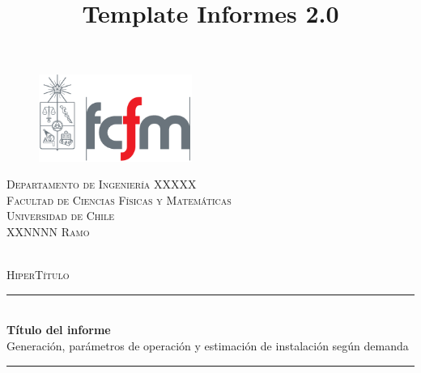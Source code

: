 \documentclass[12pt, letterpaper]{article}
\title{Template Informes 2.0} %
\newcommand{\titulo}{Título del informe}
\newcommand{\ramo}{XXNNNN Ramo}
\newcommand{\departamento}{Departamento de Ingeniería XXXXX}
\newcommand{\HRule}{\rule{\linewidth}{.4mm}}
\begin{document}

\begin{titlepage}
{
\begin{figure}
\vspace{-0.7cm}
\includegraphics[width=5cm]{fcfm.png}
\end{figure}

\textsc{\color{red}\hspace{3.2cm}\departamento}\\
\textsc{\color{gray51}\hspace{3.8cm}Facultad de Ciencias Físicas y Matemáticas}\\
\textsc{\color{gray51}\hspace{3.8cm}Universidad de Chile}\\
\textsc{\color{gray51}\hspace{3.8cm}\ramo}\\
}

\begin{center}
~\\[5cm]
{\color{gray71}\textsc{HiperTítulo}}
\HRule~ \\[0.4cm]
{ \Huge \textup \bfseries  \titulo}\\[0.4cm]
{ \Large \textup{Generación, parámetros de operación y estimación de instalación según demanda}}\\[0.2cm]
\HRule 
~\\[3.5cm]
\end{center}


\end{titlepage}
\end{document}

